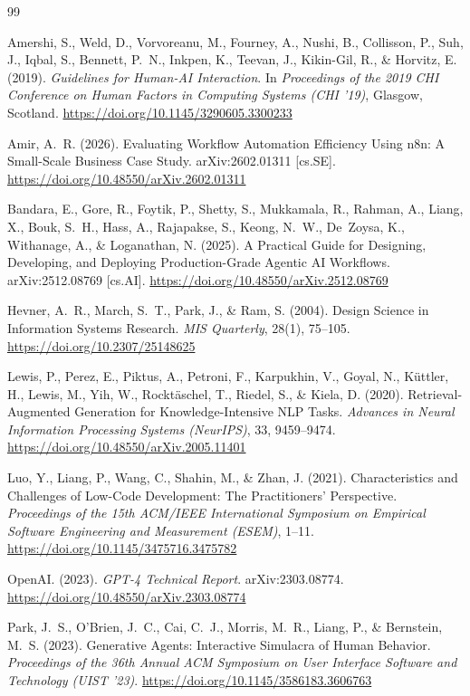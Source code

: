 \documentclass[12pt,a4paper,oneside]{report}
\begin{document}
\begin{thebibliography}{99}

  Amershi, S., Weld, D., Vorvoreanu, M., Fourney, A., Nushi, B., Collisson, P.,
  Suh, J., Iqbal, S., Bennett, P.~N., Inkpen, K., Teevan, J., Kikin-Gil, R.,
  \& Horvitz, E. (2019).
  \textit{Guidelines for Human-AI Interaction}.
  In \textit{Proceedings of the 2019 CHI Conference on Human Factors in Computing
  Systems (CHI '19)}, Glasgow, Scotland.
  \url{https://doi.org/10.1145/3290605.3300233}

  Amir, A.~R. (2026).
  Evaluating Workflow Automation Efficiency Using n8n:
  A Small-Scale Business Case Study.
  arXiv:2602.01311 [cs.SE].
  \url{https://doi.org/10.48550/arXiv.2602.01311}

  Bandara, E., Gore, R., Foytik, P., Shetty, S., Mukkamala, R., Rahman, A.,
  Liang, X., Bouk, S.~H., Hass, A., Rajapakse, S., Keong, N.~W.,
  De~Zoysa, K., Withanage, A., \& Loganathan, N. (2025).
  A Practical Guide for Designing, Developing, and Deploying
  Production-Grade Agentic AI Workflows.
  arXiv:2512.08769 [cs.AI].
  \url{https://doi.org/10.48550/arXiv.2512.08769}

  Hevner, A.~R., March, S.~T., Park, J., \& Ram, S. (2004).
  Design Science in Information Systems Research.
  \textit{MIS Quarterly}, 28(1), 75--105.
  \url{https://doi.org/10.2307/25148625}

  Lewis, P., Perez, E., Piktus, A., Petroni, F., Karpukhin, V., Goyal, N.,
  Küttler, H., Lewis, M., Yih, W., Rocktäschel, T., Riedel, S., \& Kiela, D. (2020).
  Retrieval-Augmented Generation for Knowledge-Intensive NLP Tasks.
  \textit{Advances in Neural Information Processing Systems (NeurIPS)}, 33, 9459--9474.
  \url{https://doi.org/10.48550/arXiv.2005.11401}

  Luo, Y., Liang, P., Wang, C., Shahin, M., \& Zhan, J. (2021).
  Characteristics and Challenges of Low-Code Development:
  The Practitioners' Perspective.
  \textit{Proceedings of the 15th ACM/IEEE International Symposium on Empirical
  Software Engineering and Measurement (ESEM)}, 1--11.
  \url{https://doi.org/10.1145/3475716.3475782}

  OpenAI. (2023).
  \textit{GPT-4 Technical Report}.
  arXiv:2303.08774.
  \url{https://doi.org/10.48550/arXiv.2303.08774}

  Park, J.~S., O'Brien, J.~C., Cai, C.~J., Morris, M.~R., Liang, P.,
  \& Bernstein, M.~S. (2023).
  Generative Agents: Interactive Simulacra of Human Behavior.
  \textit{Proceedings of the 36th Annual ACM Symposium on User Interface Software and
  Technology (UIST '23)}.
  \url{https://doi.org/10.1145/3586183.3606763}


\end{thebibliography}
\end{document}

